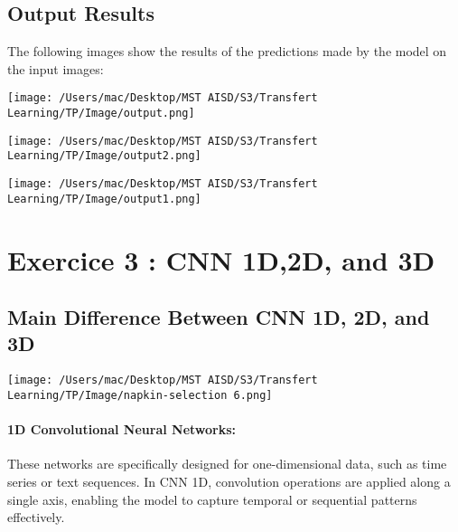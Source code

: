 \documentclass{article}
\begin{document}
\subsection{Output Results}

The following images show the results of the predictions made by the model on the input images:
\begin{center}
    \begin{minipage}{0.3\textwidth}
        \texttt{[image: /Users/mac/Desktop/MST AISD/S3/Transfert Learning/TP/Image/output.png]}
    \end{minipage}
    \hspace{1cm} %
    \begin{minipage}{0.3\textwidth}
        \texttt{[image: /Users/mac/Desktop/MST AISD/S3/Transfert Learning/TP/Image/output2.png]}
    \end{minipage}
    \hspace{1cm} %
    \begin{minipage}{0.3\textwidth}
        \texttt{[image: /Users/mac/Desktop/MST AISD/S3/Transfert Learning/TP/Image/output1.png]}
    \end{minipage}
\end{center}
\newpage

\section{Exercice 3 : CNN 1D,2D, and 3D}

\subsection{Main Difference Between CNN 1D, 2D, and 3D}
\begin{center}
    \texttt{[image: /Users/mac/Desktop/MST AISD/S3/Transfert Learning/TP/Image/napkin-selection 6.png]}    
\end{center}

\paragraph{1D Convolutional Neural Networks:} 
These networks are specifically designed for one-dimensional data, such as time series or text sequences. In CNN 1D, convolution operations are applied along a single axis, enabling the model to capture temporal or sequential patterns effectively.
\end{document}
